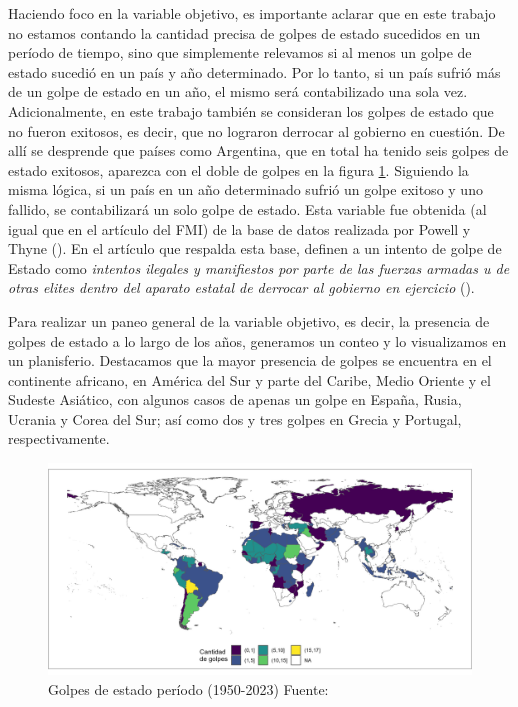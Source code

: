 \documentclass{article}
\begin{document}
Haciendo foco en la variable objetivo, es importante aclarar que en este trabajo no 
estamos contando la cantidad precisa
de golpes de estado sucedidos en un período de tiempo, sino que simplemente relevamos
si al menos un golpe de estado sucedió en un país y año determinado. Por lo tanto, si
un país sufrió más de un golpe de estado en un año, el mismo será contabilizado una
sola vez. Adicionalmente, en este trabajo también se consideran los golpes de estado
que no fueron exitosos, es decir, que no lograron derrocar al gobierno en cuestión. 
De allí se desprende que países como Argentina, que en total ha tenido seis golpes de 
estado exitosos, aparezca con el doble de golpes en la figura \ref{fig::mapa_golpes}.
Siguiendo la misma lógica, si un país en un año determinado sufrió un golpe exitoso y 
uno fallido, se contabilizará un solo golpe de estado.
Esta variable fue obtenida (al igual que en el artículo del FMI) de la base de datos
realizada por Powell y Thyne (\citeyear{Pow11}). En el artículo que respalda esta base, 
definen a un intento de golpe de Estado como \textit{intentos ilegales y manifiestos por parte 
de las fuerzas armadas u de otras elites dentro del aparato estatal de derrocar al 
gobierno en ejercicio} (\cite[p.~252]{Pow11}).

Para realizar un paneo general de la variable objetivo, es decir, la presencia de
golpes de estado a lo largo de los años, generamos un conteo y lo visualizamos en un 
planisferio. Destacamos que la mayor presencia de golpes se encuentra en el 
continente africano, en América del Sur y parte del Caribe, Medio Oriente y el 
Sudeste Asiático, con algunos casos de apenas un golpe en España, Rusia, Ucrania 
y Corea del Sur; así como dos y tres golpes en Grecia y Portugal, respectivamente.

\begin{figure}[H]
 \centering 
 \includegraphics[width=1\textwidth]{2_golpes.png}
 \caption{Golpes de estado período (1950-2023) Fuente: \cite{Pow11} \label{fig::mapa_golpes}}
\end{figure}
\end{document}
